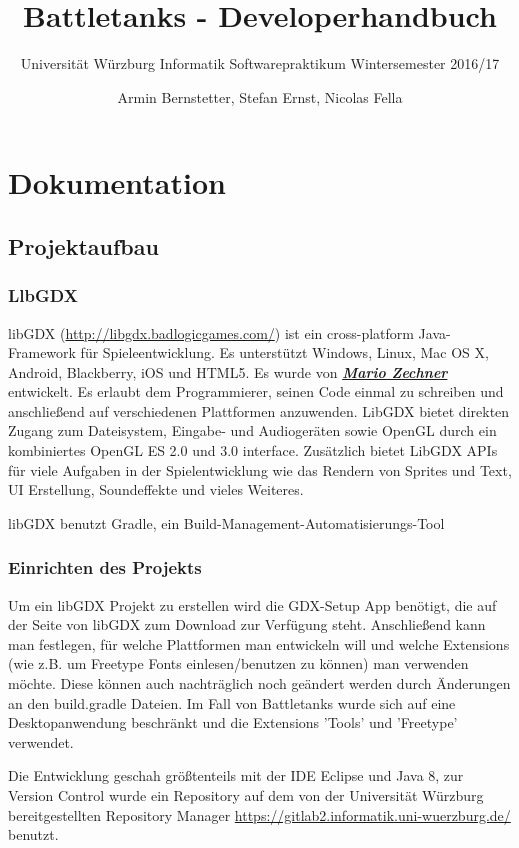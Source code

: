 \documentclass[a4paper]{scrreprt}
\title{Battletanks - Developerhandbuch}
\subtitle{Universität Würzburg Informatik Softwarepraktikum Wintersemester 2016/17}
\author{Armin Bernstetter, Stefan Ernst, Nicolas Fella}
\begin{document}
\maketitle
\tableofcontents
\newpage



\chapter{Dokumentation}
\section{Projektaufbau}
\subsection{LlbGDX}
libGDX (\url{http://libgdx.badlogicgames.com/}) ist ein cross-platform Java-Framework für Spieleentwicklung. Es unterstützt Windows, Linux, Mac OS X, Android, Blackberry, iOS und HTML5.
Es wurde von \href{https://twitter.com/badlogicgames}{\textbf{\textit{Mario Zechner}}} entwickelt.
Es erlaubt dem Programmierer, seinen Code einmal zu schreiben und anschließend auf verschiedenen Plattformen anzuwenden.
LibGDX bietet direkten Zugang zum Dateisystem, Eingabe- und Audiogeräten sowie OpenGL durch ein kombiniertes OpenGL ES 2.0 und 3.0 interface.
Zusätzlich bietet LibGDX APIs für viele Aufgaben in der Spielentwicklung wie das Rendern von Sprites und Text, UI Erstellung, Soundeffekte und vieles Weiteres.

libGDX benutzt Gradle, ein Build-Management-Automatisierungs-Tool


\subsection{Einrichten des Projekts}
Um ein libGDX Projekt zu erstellen wird die GDX-Setup App benötigt, die auf der Seite von libGDX zum Download zur Verfügung steht. Anschließend kann man festlegen, für welche Plattformen man entwickeln will und welche Extensions (wie z.B. um Freetype Fonts einlesen/benutzen zu können) man verwenden möchte. Diese können auch nachträglich noch geändert werden durch Änderungen an den build.gradle Dateien.
Im Fall von Battletanks wurde sich auf eine Desktopanwendung beschränkt und die Extensions 'Tools' und 'Freetype' verwendet.

Die Entwicklung geschah größtenteils mit der IDE Eclipse und Java 8, zur Version Control wurde ein Repository auf dem von der Universität Würzburg bereitgestellten Repository Manager \url{https://gitlab2.informatik.uni-wuerzburg.de/} benutzt.
\end{document}

